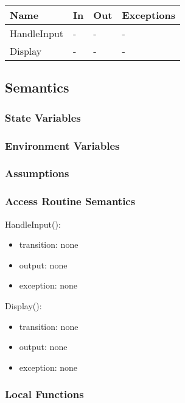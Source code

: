 \documentclass[12pt, titlepage]{article}
\begin{document}
\begin{itemize}
\begin{center}
\begin{tabular}{p{2cm} p{4cm} p{4cm} p{2cm}}
\hline
\textbf{Name} & \textbf{In} & \textbf{Out} & \textbf{Exceptions} \\
\hline
HandleInput & - & - & - \\
Display & - & - & - \\

\hline
\end{tabular}
\end{center}

\subsection{Semantics}

\subsubsection{State Variables}

\subsubsection{Environment Variables}

\subsubsection{Assumptions}

\subsubsection{Access Routine Semantics}

\noindent HandleInput():
\begin{itemize}
\item transition: none
\item output: none
\item exception: none
\end{itemize}

\noindent Display():
\begin{itemize}
\item transition: none
\item output: none
\item exception: none
\end{itemize}

\subsubsection{Local Functions}


\end{itemize}
\end{document}
